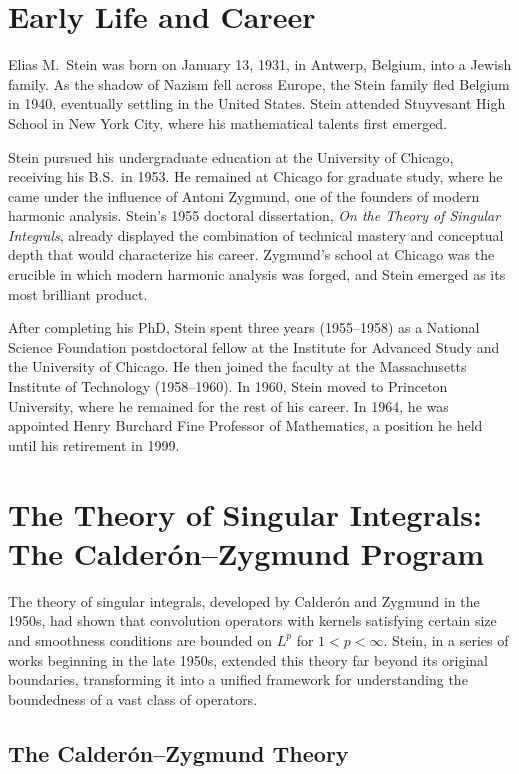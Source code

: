 \section{Early Life and Career}

Elias M.\ Stein was born on January 13, 1931, in Antwerp, Belgium, into a Jewish family. As the shadow of Nazism fell across Europe, the Stein family fled Belgium in 1940, eventually settling in the United States. Stein attended Stuyvesant High School in New York City, where his mathematical talents first emerged.

Stein pursued his undergraduate education at the University of Chicago, receiving his B.S.\ in 1953. He remained at Chicago for graduate study, where he came under the influence of Antoni Zygmund, one of the founders of modern harmonic analysis. Stein's 1955 doctoral dissertation, \textit{On the Theory of Singular Integrals}, already displayed the combination of technical mastery and conceptual depth that would characterize his career. Zygmund's school at Chicago was the crucible in which modern harmonic analysis was forged, and Stein emerged as its most brilliant product.

After completing his PhD, Stein spent three years (1955--1958) as a National Science Foundation postdoctoral fellow at the Institute for Advanced Study and the University of Chicago. He then joined the faculty at the Massachusetts Institute of Technology (1958--1960). In 1960, Stein moved to Princeton University, where he remained for the rest of his career. In 1964, he was appointed Henry Burchard Fine Professor of Mathematics, a position he held until his retirement in 1999.

\section{The Theory of Singular Integrals: The Calder\'on--Zygmund Program}

The theory of singular integrals, developed by Calder\'on and Zygmund in the 1950s, had shown that convolution operators with kernels satisfying certain size and smoothness conditions are bounded on \(L^p\) for \(1 < p < \infty\). Stein, in a series of works beginning in the late 1950s, extended this theory far beyond its original boundaries, transforming it into a unified framework for understanding the boundedness of a vast class of operators.

\subsection{The Calder\'on--Zygmund Theory}

